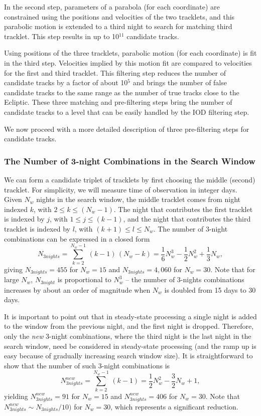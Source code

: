 In the second step, parameters of a parabola (for each coordinate) are constrained using the
positions and velocities of the two tracklets, and this parabolic motion is extended to a third
night to search for matching third tracklet. This step results in up to 10$^{11}$ candidate
tracks.

Using positions of the three tracklets, parabolic motion (for each coordinate) is fit
in the third step. Velocities implied by this motion fit are compared to velocities for
the first and third tracklet. This filtering step reduces the number of candidate tracks
by a factor of about 10$^{5}$ and brings the number of false candidate tracks to
the same range as the number of true tracks close to the Ecliptic. These three matching
and pre-filtering steps bring the number of candidate tracks to a level that
can be easily handled by the IOD filtering step.

We now proceed with a more detailed description of three pre-filtering steps
for candidate tracks.

\subsubsection{The Number of 3-night Combinations in the Search Window}

We can form a candidate triplet of tracklets by first choosing the middle (second) tracklet.
For simplicity, we will measure time of observation in integer days. Given $N_w$ nights
in the search window, the middle tracklet comes from night indexed $k$, with
$2 \le k \le (N_w-1)$. The night that contributes the first tracklet is indexed by $j$,
with $1 \le j \le (k-1)$, and the night that contributes the third tracklet is indexed by $l$,
with $(k+1) \le l \le N_w$. The number of 3-night combinations can be expressed in a closed
form
\begin{equation}
\label{eq:N3}
  N_{3nights} = \sum_{k=2}^{N_w-1} \, (k-1)\, (N_w-k) =\frac{1}{6}N_w^3 - \frac{1}{2}N_w^2 + \frac{1}{3}N_w,
\end{equation}
giving $N_{3nights} = 455$ for $N_w=15$ and $N_{3nights} = 4,060$ for $N_w=30$.  Note
that for large $N_w$, $N_{3night}$ is proportional to $N_w^3$ -- the number of 3-nights
combinations increases by about an order of magnitude when $N_w$ is doubled from
15 days to 30 days.

It is important to point out that in steady-state processing a single night is added to the
window from the previous night, and the first night is dropped. Therefore, only the {\it new}
3-night combinations, where the third night is the last night in the search window, need
be considered in steady-state processing (and the ramp up is easy because of gradually
increasing search window size). It is straightforward to show that the number of such
3-night combinations is
\begin{equation}
\label{eq:N3n}
  N_{3nights}^{new} = \sum_{k=2}^{N_w-1} \, (k-1) =\frac{1}{2}N_w^2 - \frac{3}{2}N_w + 1,
\end{equation}
yielding $N_{3nights}^{new} = 91$ for $N_w=15$ and $N_{3nights}^{new} = 406$ for $N_w=30$.
Note that $N_{3nights}^{new} \sim N_{3nights} / 10)$ for $N_w=30$, which represents
a significant reduction.



